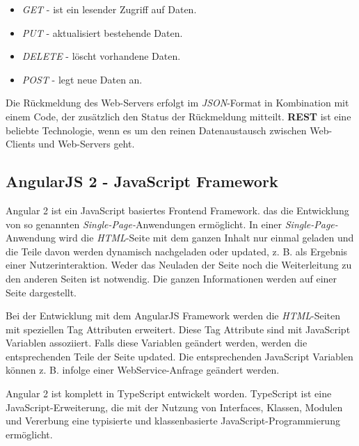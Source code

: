 \begin{itemize}

\item \textit{GET} - ist ein lesender Zugriff auf Daten.
\item \textit{PUT} - aktualisiert bestehende Daten.
\item \textit{DELETE} - löscht vorhandene Daten.
\item \textit{POST} - legt neue Daten an.

\end{itemize} 

Die Rückmeldung des Web-Servers erfolgt im \textit{JSON}-Format in Kombination mit einem Code, der zusätzlich den Status der Rückmeldung mitteilt.
\textbf{REST} ist eine beliebte Technologie, wenn es um den reinen Datenaustausch zwischen Web-Clients und Web-Servers geht. 

\subsection{AngularJS 2 - JavaScript Framework}
Angular 2 ist ein JavaScript basiertes Frontend Framework. das die Entwicklung von so genannten \textit{Single-Page-}Anwendungen ermöglicht. In einer \textit{Single-Page-}Anwendung wird die \textit{HTML}-Seite mit dem ganzen Inhalt nur einmal geladen und die Teile davon werden dynamisch nachgeladen oder updated, z. B. als Ergebnis einer Nutzerinteraktion. Weder das Neuladen der Seite noch die Weiterleitung zu den anderen Seiten ist notwendig. Die ganzen Informationen werden auf einer Seite dargestellt. 

Bei der Entwicklung mit dem AngularJS Framework werden die \textit{HTML}-Seiten mit speziellen Tag Attributen erweitert. Diese Tag Attribute sind mit JavaScript Variablen assoziiert. Falls diese Variablen geändert werden, werden die entsprechenden Teile der Seite updated. Die entsprechenden JavaScript Variablen können z. B. infolge einer WebService-Anfrage geändert werden. 

Angular 2 ist komplett in TypeScript entwickelt worden. TypeScript ist eine JavaScript-Erweiterung, die mit der Nutzung von Interfaces, Klassen, Modulen und Vererbung eine typisierte und klassenbasierte JavaScript-Programmierung ermöglicht. \cite{typescript}


